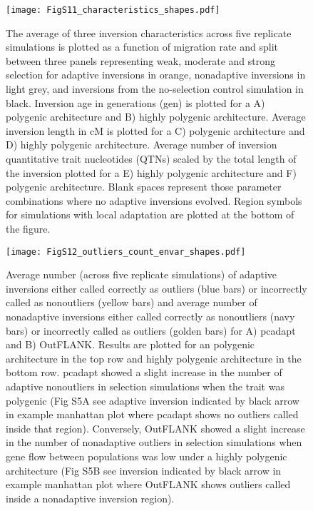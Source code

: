 \documentclass[10pt, scrartlc]{article}
\begin{document}
\begin{figure}[h]
	\begin{center}
		\texttt{[image: FigS11\_characteristics\_shapes.pdf]}
	\end{center}
	\caption[Supplementary Figure 11: Inversion Characteristics split by parameter combination]{The average of three inversion characteristics across five replicate simulations is plotted as a function of migration rate and split between three panels representing weak, moderate and strong selection for adaptive inversions in orange, nonadaptive inversions in light grey, and inversions from the no-selection control simulation in black. Inversion age in generations (gen) is plotted for a A) polygenic architecture and B) highly polygenic architecture. Average inversion length in cM is plotted for a C) polygenic architecture and D) highly polygenic architecture. Average number of inversion quantitative trait nucleotides (QTNs) scaled by the total length of the inversion plotted for a E) highly polygenic architecture and F) polygenic architecture. Blank spaces represent those parameter combinations where no adaptive inversions evolved. Region symbols for simulations with local adaptation are plotted at the bottom of the figure. }
\end{figure}

\clearpage
\newpage



\begin{figure}[h]
	\begin{center}
		\texttt{[image: FigS12\_outliers\_count\_envar\_shapes.pdf]}
	\end{center}
	\caption[Supplementary Figure 12: Genome Scan Performance for Selection Simulations]{Average number (across five replicate simulations) of adaptive inversions either called correctly as outliers (blue bars) or incorrectly called as nonoutliers (yellow bars) and average number of nonadaptive inversions either called correctly as nonoutliers (navy bars) or incorrectly called as outliers (golden bars) for A) pcadapt and B) OutFLANK. Results are plotted for an polygenic architecture in the top row and highly polygenic architecture in the bottom row. pcadapt showed a slight increase in the number of adaptive nonoutliers in selection simulations when the trait was polygenic (Fig S5A see adaptive inversion indicated by black arrow in example manhattan plot where pcadapt shows no outliers called inside that region). Conversely, OutFLANK showed a slight increase in the number of nonadaptive outliers in selection simulations when gene flow between populations was low under a highly polygenic architecture (Fig S5B see inversion indicated by black arrow in example manhattan plot where OutFLANK shows outliers called inside a nonadaptive inversion region). }
\end{figure}
\end{document}

